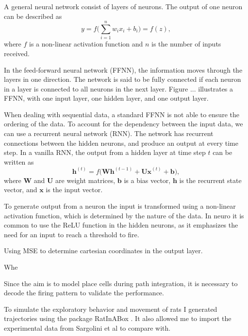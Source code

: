 A general neural network consist of layers of neurons. The output of one neuron can be described as 
\begin{equation}
    y = f \bigg( \sum_{i=1}^{n} w_{i} x_{i} + b_{i} \bigg) = f(z),
\end{equation}
where $f$ is a non-linear activation function and $n$ is the number of inputs received. 

In the feed-forward neural network (FFNN), the information moves through the layers in one direction. The network is said to be fully connected if each neuron in a layer is connected to all neurons in the next layer. Figure ... illustrates a FFNN, with one input layer, one hidden layer, and one output layer. 


When dealing with sequential data, a standard FFNN is not able to ensure the ordering of the data. To account for the dependency between the input data, we can use a recurrent neural network (RNN). The network has recurrent connections between the hidden neurons, and produce an output at every time step. In a vanilla RNN, the output from a hidden layer at time step $t$ can be written as 
\begin{equation}
    \mathbf{h}^{(t)} = f \bigg( \mathbf{Wh}^{(t-1)} + \mathbf{Ux}^{(t)} +  \mathbf{b} \bigg), 
\end{equation}
where $\mathbf{W}$ and $\mathbf{U}$ are weight matrices, $\mathbf{b}$ is a bias vector, $\mathbf{h}$ is the recurrent state vector, and $\mathbf{x}$ is the input vector.

To generate output from a neuron the input is transformed using a non-linear activation function, which is determined by the nature of the data. In neuro it is common to use the ReLU function in the hidden neurons, as it emphasizes the need for an input to reach a threshold to fire.

Using MSE to determine cartesian coordinates in the output layer.

Whe


Since the aim is to model place cells during path integration, it is necessary to decode the firing pattern to validate the performance. 

To simulate the exploratory behavior and movement of rats I generated trajectories using the package RatInABox \cite{george:2022:ratinabox}. It also allowed me to import the experimental data from Sargolini et al \cite{sargolini:2006:conjunctive} to compare with.

